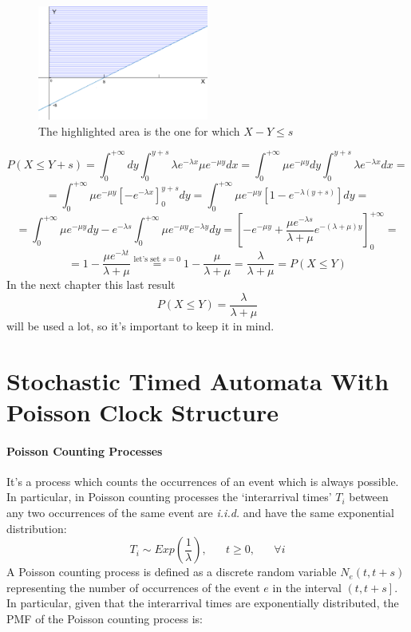 \documentclass[12pt,a4paper]{article}
\begin{document}
\\\bigskip
\begin{figure}[H]
\begin{center}
\includegraphics[width=0.5\textwidth]{IMG/CommArea2.eps}
\caption{\small The highlighted area is the one for which $X-Y\leq s$}
\label{Picture 2}
\end{center}
\end{figure}
$$
P(X \leq Y+s) = \int_{0}^{+\infty}dy\int_{0}^{y+s}\lambda e^{-\lambda x}\mu e^{-\mu y}dx
= \int_{0}^{+\infty}\mu e^{-\mu y}dy\int_{0}^{y+s}\lambda e^{-\lambda x}dx = 
$$
$$
=\int_{0}^{+\infty}\mu e^{-\mu y}\left[ -e^{-\lambda x}\right]_0^{y+s}dy
= \int_{0}^{+\infty}\mu e^{-\mu y}\left[ 1-e^{-\lambda(y+s)}\right]dy =
$$
$$
= \int_{0}^{+\infty}\mu e^{-\mu y}dy - e^{-\lambda s}\int_{0}^{+\infty}\mu e^{-\mu y} e^{-\lambda y}dy
= \left[-e^{-\mu y} + \frac{\mu e^{-\lambda s}}{\lambda + \mu}e^{-(\lambda+\mu)y}\right]_{0}^{+\infty} =
$$
$$
= 1-\frac{\mu e^{-\lambda t}}{\lambda + \mu} \overset{\textrm{let's set }s=0}{\hspace{15pt}=\hspace{15pt}} 1-\frac{\mu}{\lambda + \mu} = \frac{\lambda}{\lambda + \mu} = P(X\leq Y) 
$$
In the next chapter this last result
\begin{equation}
P(X\leq Y)= \frac{\lambda}{\lambda + \mu}
\end{equation}
will be used a lot, so it's important to keep it in mind.
\section{Stochastic Timed Automata With Poisson Clock Structure}
\paragraph{Poisson Counting Processes} It's a process which counts the occurrences of an event which is always possible. In particular, in Poisson counting processes the `interarrival times' $T_i$ between any two occurrences of the same event are \textit{i.i.d.} and have the same exponential distribution:
$$
T_i\sim Exp\left(\frac{1}{\lambda}\right),\hspace{20pt}t\geq 0,\hspace{20pt}\forall i
$$
\noindent
A Poisson counting process is defined as a discrete random variable $N_e(t,t+s)$ representing the number of occurrences of the event $e$ in the interval $\left( t,t+s\right]$. In particular, given that the interarrival times are exponentially distributed, the PMF of the Poisson counting process is:
\end{document}
